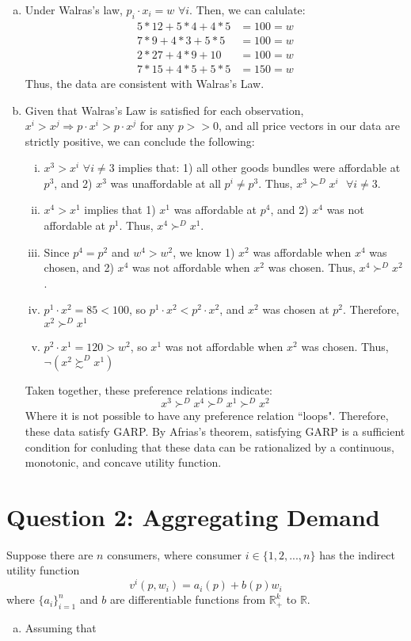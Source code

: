 \documentclass{article}
\newcommand{\R}{\mathbb{R}}
\begin{document}
\begin{enumerate}[(a)]
	\item Under Walras's law, $p_i\cdot x_i = w$ $\forall i$. Then, we can calulate:
		\begin{align*}
			5*12+5*4+4*5	&= 100 = w	\\
			7*9+4*3+5*5		&= 100 = w	\\
			2*27+4*9+10		&= 100 = w	\\
			7*15+4*5+5*5	&= 150 = w
		\end{align*}
		Thus, the data are consistent with Walras's Law.
		
	\item Given that Walras's Law is satisfied for each observation, $x^i>x^j\Rightarrow p\cdot x^i>p\cdot x^j$ for any $p>>0$, and all price vectors in our data are strictly positive, we can conclude the following:
		\begin{enumerate}[i.]
			\item $x^3>x^i$ $\forall i\neq 3$ implies that: 1) all other goods bundles were affordable at $p^3$, and 2) $x^3$ was unaffordable at all $p^i\neq p^3$. Thus, ${x^3\succ^D x^i\text{ }\forall i\neq 3}$.
			\item $x^4>x^1$ implies that 1) $x^1$ was affordable at $p^4$, and 2) $x^4$ was not affordable at $p^1$. Thus, ${x^4\succ^D x^1}$.
			\item Since $p^4=p^2$ and $w^4>w^2$, we know 1) $x^2$ was affordable when $x^4$ was chosen, and 2) $x^4$ was not affordable when $x^2$ was chosen. Thus, ${x^4\succ^D x^2}$.
			\item $p^1\cdot x^2 = 85<100$, so $p^1\cdot x^2 < p^2\cdot x^2$, and $x^2$ was chosen at $p^2$. Therefore, ${x^2\succ^D x^1}$
			\item $p^2\cdot x^1=120>w^2$, so $x^1$ was not affordable when $x^2$ was chosen. Thus, $\neg(x^2\succsim^D x^1)$
		\end{enumerate}
		Taken together, these preference relations indicate:
		\[
			x^3\succ^D x^4 \succ^D x^1 \succ^D x^2
		\]
		Where it is not possible to have any preference relation ``loops". Therefore, these data satisfy GARP. By Afrias's theorem, satisfying GARP is a sufficient condition for conluding that these data can be rationalized by a continuous, monotonic, and concave utility function.
\end{enumerate}


\section*{Question 2: Aggregating Demand}
Suppose there are $n$ consumers, where consumer $i\in\{1,2,...,n\}$ has the indirect utility function 
\[
	v^i(p,w_i) = a_i(p) + b(p)w_i 
\]
where $\{a_i\}_{i=1}^n$ and $b$ are differentiable functions from $\R_+^k$ to $\R$.
\begin{enumerate}[(a)]
	\item Assuming that 
\end{enumerate}


\end{document}
